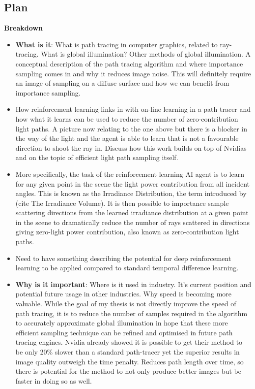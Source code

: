 \documentclass[ %
                    author={Callum Pearce},
                supervisor={Dr. Neill Campbell},
                    degree={MEng},
                     title={How effective are Temporal difference learning methods for reducing the number of zero contribution light paths while still accurately approximating Global Illumination in Path tracing?},
                  subtitle={},
                      type={research},
                      year={2019} ]{dissertation}
\begin{document}
\subsection{Plan}
\textbf{Breakdown}
\begin{itemize}

\item \textbf{What is it}: What is path tracing in computer graphics, related to ray-tracing. What is global illumination? Other methods of global illumination. A conceptual description of the path tracing algorithm and where importance sampling comes in and why it reduces image noise. This will definitely require an image of sampling on a diffuse surface and how we can benefit from importance sampling. 


\item How reinforcement learning links in with on-line learning in a path tracer and how what it learns can be used to reduce the number of zero-contribution light paths. A picture now relating to the one above but there is a blocker in the way of the light and the agent is able to learn that is not a favourable direction to shoot the ray in. Discuss how this work builds on top of Nvidias and on the topic of efficient light path sampling itself.

\item More specifically, the task of the reinforcement learning AI agent is to learn 
for any given point in the scene the light power contribution from all incident angles. 
This is known as the Irradiance Distribution, the term introduced by (cite The 
Irradiance Volume). It is then possible to importance sample scattering directions 
from the learned irradiance distribution at a given point in the scene to dramatically
reduce the number of rays scattered in directions giving zero-light power 
contribution, also known as zero-contribution light paths. 

\item Need to have something describing the potential for deep reinforcement learning to be applied compared to standard temporal difference learning.

\item \textbf{Why is it important}: Where is it used in industry. It's current position and potential future usage in other industries. Why speed is becoming more valuable. While the goal of my thesis is not directly improve the speed of path tracing, it is to reduce the number of samples required in the algorithm to accurately approximate global illumination in hope that these more efficient sampling technique can be refined and optimised in future path tracing engines. Nvidia already showed it is possible to get their method to be only 20\% slower than a standard path-tracer yet the superior results in image quality outweigh the time penalty. Reduces path length over time, so there is potential for the method to not only produce better images but be faster in doing so as well.


\end{itemize}
\end{document}
